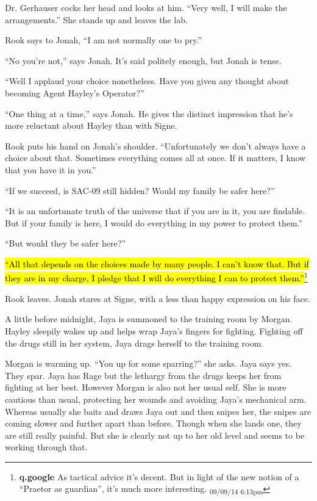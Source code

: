 Dr. Gerhauser cocks her head and looks at him.  ``Very well, I will make the arrangements.''  She stands up and leaves the lab.

Rook says to Jonah, ``I am not normally one to pry.''

``No you're not,'' says Jonah.  It's said politely enough, but Jonah is tense.

``Well I applaud your choice nonetheless.  Have you given any thought about becoming Agent Hayley's Operator?'' 

``One thing at a time,'' says Jonah.  He gives the distinct impression that he's more reluctant about Hayley than with Signe.

Rook puts his hand on Jonah's shoulder.  ``Unfortunately we don't always have a choice about that.  Sometimes everything comes all at once.  If it matters, I know that you have it in you.''

``If we succeed, is SAC-09 still hidden?  Would my family be safer here?''

``It is an unfortunate truth of the universe that if you are in it, you are findable.  But if your family is here, I would do everything in my power to protect them.''

``But would they be safer here?''

\hl{``All that depends on the choices made by many people.  I can't know that.  But if they are in my charge, I pledge that I will do everything I can to protect them.''}\footnote{\textbf{q.google }As tactical advice it's decent.  But in light of the new notion of a ``Praetor as guardian'', it's much more interesting. \textsubscript{09/09/14 6:13pm}}

Rook leaves.  Jonah stares at Signe, with a less than happy expression on his face.





A little before midnight, Jaya is summoned to the training room by Morgan.  Hayley sleepily wakes up and helps wrap Jaya's fingers for fighting.  Fighting off the drugs still in her system, Jaya drags herself to the training room.



Morgan is warming up. ``You up for some sparring?'' she asks.  Jaya says yes.  They spar.  Jaya has Rage but the lethargy from the drugs keeps her from fighting at her best.  However Morgan is also not her usual self. She is more cautious than usual, protecting her wounds and avoiding Jaya's mechanical arm.  Whereas usually she baits and draws Jaya out and then snipes her, the snipes are coming slower and further apart than before.  Though when she lands one, they are still really painful.  But she is clearly not up to her old level and seems to be working through that.



